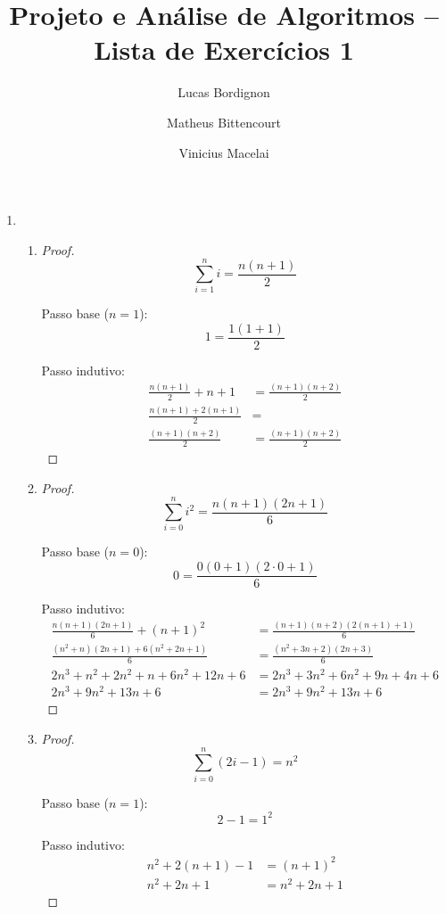 \documentclass{article}
\title{Projeto e Análise de Algoritmos -- Lista de Exercícios 1}
\author{Lucas Bordignon \and Matheus Bittencourt \and Vinicius Macelai}
\date{}
\begin{document}
\maketitle

\begin{enumerate}
	\item \begin{enumerate}
		\item \begin{proof}
		$$\sum_{i=1}^n i = \frac{n(n+1)}{2}$$

		Passo base ($n=1$):
		$$1 = \frac{1(1+1)}{2}$$

		Passo indutivo:
		\begin{align*}
			\frac{n(n+1)}{2} + n+1 &= \frac{(n+1)(n+2)}{2} \\
			\frac{n(n+1) + 2(n+1)}{2} &= \\
			\frac{(n+1)(n+2)}{2} &= \frac{(n+1)(n+2)}{2}
		\end{align*}
		\end{proof}

		\item \begin{proof}
		$$\sum_{i=0}^n i^2 = \frac{n(n+1)(2n+1)}{6}$$

		Passo base ($n=0$):
		$$0 = \frac{0(0+1)(2\cdot0+1)}{6}$$

		Passo indutivo:
		\begin{align*}
			\frac{n(n+1)(2n+1)}{6}+(n+1)^2 &= \frac{(n+1)(n+2)(2(n+1)+1)}{6} \\
			\frac{(n^2+n)(2n+1)+6(n^2+2n+1)}{6} &= \frac{(n^2+3n+2)(2n+3)}{6} \\
			2n^3 + n^2 + 2n^2 + n + 6n^2 + 12n + 6 &=
				2n^3 + 3n^2 + 6n^2 + 9n + 4n + 6 \\
			2n^3 + 9n^2 + 13n + 6 &= 2n^3 + 9n^2 + 13n + 6
		\end{align*}
		\end{proof}

		\item \begin{proof}
		$$\sum_{i=0}^n (2i - 1) = n^2$$

		Passo base ($n=1$):
		$$2-1=1^2$$

		Passo indutivo:
		\begin{align*}
			n^2 + 2(n+1) - 1 &= (n+1)^2 \\
			n^2 + 2n + 1 &= n^2 + 2n + 1
		\end{align*}
		\end{proof}


\end{enumerate}
\end{enumerate}
\end{document}
